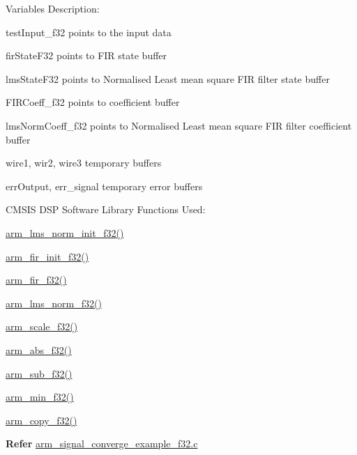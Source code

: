 \begin{DoxyParagraph}{}

\end{DoxyParagraph}
\begin{DoxyParagraph}{Variables Description\-:}

\end{DoxyParagraph}
\begin{DoxyParagraph}{}
\begin{DoxyItemize}
\item {\ttfamily test\-Input\-\_\-f32} points to the input data \item {\ttfamily fir\-State\-F32} points to F\-I\-R state buffer \item {\ttfamily lms\-State\-F32} points to Normalised Least mean square F\-I\-R filter state buffer \item {\ttfamily F\-I\-R\-Coeff\-\_\-f32} points to coefficient buffer \item {\ttfamily lms\-Norm\-Coeff\-\_\-f32} points to Normalised Least mean square F\-I\-R filter coefficient buffer \item {\ttfamily wire1}, wir2, wire3 temporary buffers \item {\ttfamily err\-Output}, err\-\_\-signal temporary error buffers\end{DoxyItemize}

\end{DoxyParagraph}
\begin{DoxyParagraph}{C\-M\-S\-I\-S D\-S\-P Software Library Functions Used\-:}

\end{DoxyParagraph}
\begin{DoxyParagraph}{}

\begin{DoxyItemize}
\item \hyperlink{group___l_m_s___n_o_r_m_gac7ccbaea863882056eee815456464670}{arm\-\_\-lms\-\_\-norm\-\_\-init\-\_\-f32()}
\item \hyperlink{group___f_i_r_ga98d13def6427e29522829f945d0967db}{arm\-\_\-fir\-\_\-init\-\_\-f32()}
\item \hyperlink{group___f_i_r_gae8fb334ea67eb6ecbd31824ddc14cd6a}{arm\-\_\-fir\-\_\-f32()}
\item \hyperlink{group___l_m_s___n_o_r_m_ga2418c929087c6eba719758eaae3f3300}{arm\-\_\-lms\-\_\-norm\-\_\-f32()}
\item \hyperlink{group__scale_ga3487af88b112f682ee90589cd419e123}{arm\-\_\-scale\-\_\-f32()}
\item \hyperlink{group___basic_abs_ga421b6275f9d35f50286c0ff3beceff02}{arm\-\_\-abs\-\_\-f32()}
\item \hyperlink{group___basic_sub_ga7f975a472de286331134227c08aad826}{arm\-\_\-sub\-\_\-f32()}
\item \hyperlink{group___min_gaf62b1673740fc516ea64daf777b7d74a}{arm\-\_\-min\-\_\-f32()}
\item \hyperlink{group__copy_gadd1f737e677e0e6ca31767c7001417b3}{arm\-\_\-copy\-\_\-f32()}
\end{DoxyItemize}
\end{DoxyParagraph}
{\bfseries  Refer } \hyperlink{arm_signal_converge_example_f32_8c-example}{arm\-\_\-signal\-\_\-converge\-\_\-example\-\_\-f32.\-c} 